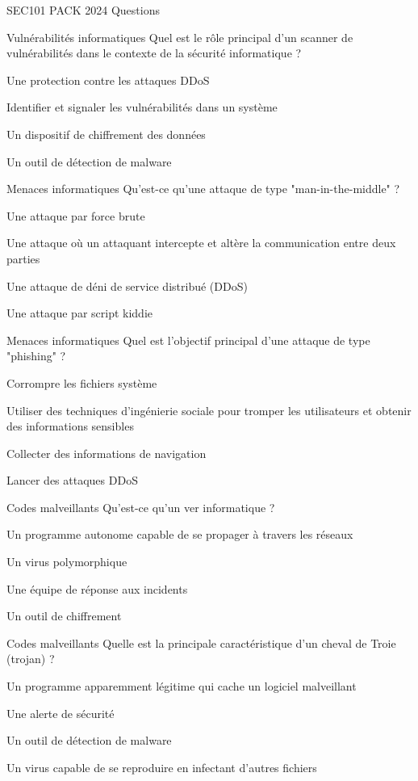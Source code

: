 \documentclass[12pt]{article}
\begin{document}
\begin{quiz}{SEC101 PACK 2024 Questions}
\begin{multi}[points=1]{Vulnérabilités informatiques}
Quel est le rôle principal d'un scanner de vulnérabilités dans le contexte de la sécurité informatique ?
    \item Une protection contre les attaques DDoS
    \item *Identifier et signaler les vulnérabilités dans un système
    \item Un dispositif de chiffrement des données
    \item Un outil de détection de malware
\end{multi}

\begin{multi}[points=1]{Menaces informatiques}
Qu'est-ce qu'une attaque de type "man-in-the-middle" ?
    \item Une attaque par force brute
    \item *Une attaque où un attaquant intercepte et altère la communication entre deux parties
    \item Une attaque de déni de service distribué (DDoS)
    \item Une attaque par script kiddie
\end{multi}

\begin{multi}[points=1]{Menaces informatiques}
Quel est l'objectif principal d'une attaque de type "phishing" ?
    \item Corrompre les fichiers système
    \item *Utiliser des techniques d'ingénierie sociale pour tromper les utilisateurs et obtenir des informations sensibles
    \item Collecter des informations de navigation
    \item Lancer des attaques DDoS
\end{multi}

\begin{multi}[points=1]{Codes malveillants}
Qu'est-ce qu'un ver informatique ?
    \item *Un programme autonome capable de se propager à travers les réseaux
    \item Un virus polymorphique
    \item Une équipe de réponse aux incidents
    \item Un outil de chiffrement
\end{multi}

\begin{multi}[points=1]{Codes malveillants}
Quelle est la principale caractéristique d'un cheval de Troie (trojan) ?
    \item *Un programme apparemment légitime qui cache un logiciel malveillant
    \item Une alerte de sécurité
    \item Un outil de détection de malware
    \item Un virus capable de se reproduire en infectant d'autres fichiers
\end{multi}


\end{quiz}
\end{document}
